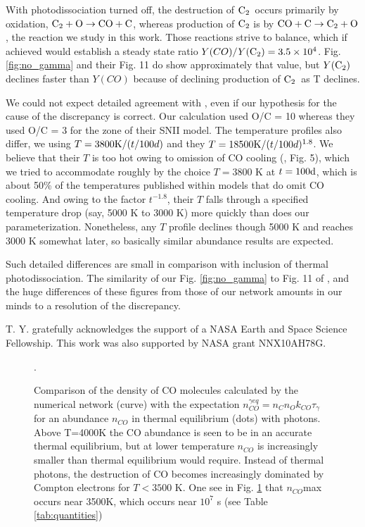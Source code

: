 \documentclass[manuscript]{aastex}
\newcommand{\ctwo}{{\rm C}_2}
\newcommand{\coctoctwo}{${\rm CO} + {\rm C} \to \ctwo + {\rm O}$}
\newcommand{\ctowotococ}{$\ctwo + {\rm O} \to {\rm CO} + {\rm C}$}
\newcommand{\ncogeq}{n_{CO}^{\gamma eq}}
\begin{document}
With photodissociation turned off, the destruction of $\ctwo$\ occurs primarily
by oxidation, \ctowotococ, whereas production of $\ctwo$ is by
\coctoctwo, the reaction we study in this work.
Those reactions strive to balance, which if achieved would
establish a steady state
ratio $Y(CO)/Y(\ctwo) = 3.5 \times 10^4$. Fig. \ref{fig:no_gamma}
and their Fig. 11 do show
approximately that value, but $Y(\ctwo)$ declines faster than $Y(CO)$
because of declining production of $\ctwo$\ as T declines.

We could not expect detailed agreement with \citet{2009ApJ...703..642C},
even if our hypothesis for the
cause of the discrepancy is correct. Our calculation used
O/C = 10 whereas they used O/C = 3 for the zone of their SNII model.
The temperature profiles also differ, we using $T=3800 {\rm K}/(t/100d)$
and they $T=18500 {\rm K}/(t/100d)^{1.8}$.
We believe that their $T$ is too hot owing to omission of CO cooling
(\citealp{1996ApJ...471..480L}, Fig. 5),
which we tried to accommodate roughly by
the choice $T=3800$ K at $t=100 {\rm d}$,
which is about 50\% of the temperatures
published within models that do omit CO cooling. And owing to the
factor $t^{-1.8}$, their $T$ falls through a specified temperature drop
(say, 5000 K to 3000 K) more quickly than does our parameterization.
Nonetheless, any $T$ profile declines though 5000 K and reaches 3000 K
somewhat later, so basically similar abundance results are expected. 

Such detailed differences are small in comparison with inclusion of
thermal photodissociation. The similarity of our Fig. \ref{fig:no_gamma}
to Fig. 11 of \citet{2009ApJ...703..642C},
and the huge differences of these figures from those of our network
amounts in our minds to a resolution of the discrepancy. 

\acknowledgments

T. Y. gratefully acknowledges the support of
a NASA Earth and Space Science Fellowship.
This work was also supported by NASA grant NNX10AH78G.

\clearpage

\begin{figure}
\caption{
Comparison of the density of CO molecules calculated by the numerical
network (curve) with the expectation $\ncogeq = n_C n_O k_{CO} \tau_\gamma$
for an abundance
$n_{CO}$ in thermal equilibrium (dots) with photons.
Above T=4000K the CO abundance is seen to be in an accurate thermal
equilibrium, but at lower temperature $n_{CO}$ is increasingly smaller than
thermal equilibrium would require. Instead of thermal photons,
the destruction of CO becomes increasingly dominated by
Compton electrons for $T < 3500$ K.
One see in Fig. \ref{fig:nco} that $n_{CO}$max occurs near 3500K,
which occurs near $10^7$ s (see Table \ref{tab:quantities})}. 
\label{fig:nco}
\end{figure}
\end{document}

